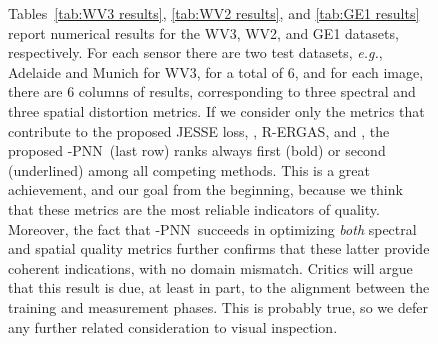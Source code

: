 \documentclass[journal]{IEEEtran}
\newcommand{\LPNN}  {-PNN}
\begin{document}
\begin{figure}
Tables~\ref{tab:WV3 results}, \ref{tab:WV2 results}, and \ref{tab:GE1 results} report numerical results for the WV3, WV2, and GE1 datasets, respectively.
For each sensor there are two test datasets, {\it e.g.}, Adelaide and Munich for WV3, for a total of 6, and
for each image, there are 6 columns of results, corresponding to three spectral and three spatial distortion metrics.
If we consider only the metrics that contribute to the proposed JESSE loss, , R-ERGAS, and ,
the proposed \LPNN\ (last row) ranks always first (bold) or second (underlined) among all competing methods.
This is a great achievement, and our goal from the beginning, because we think that these metrics are the most reliable indicators of quality.
Moreover, the fact that \LPNN\ succeeds in optimizing {\em both} spectral and spatial quality metrics
further confirms that these latter provide coherent indications, with no domain mismatch.
Critics will argue that this result is due, at least in part, to the alignment between the training and measurement phases.
This is probably true, so we defer any further related consideration to visual inspection.


\end{figure}
\end{document}
